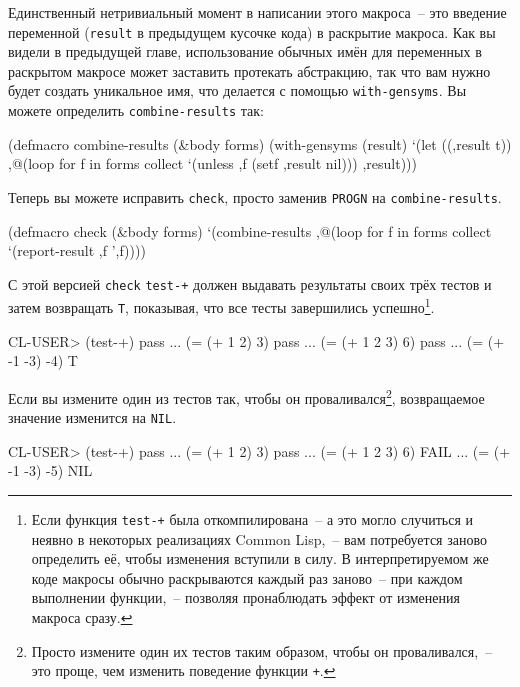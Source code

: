 Единственный нетривиальный момент в написании этого макроса~-- это введение переменной
(\lstinline{result} в предыдущем кусочке кода) в раскрытие макроса. Как вы видели в предыдущей
главе, использование обычных имён для переменных в раскрытом макросе может заставить
протекать абстракцию, так что вам нужно будет создать уникальное имя, что делается с
помощью \lstinline{with-gensyms}. Вы можете определить \lstinline{combine-results} так:

\begin{myverb}
(defmacro combine-results (&body forms)
  (with-gensyms (result)
    `(let ((,result t))
      ,@(loop for f in forms collect `(unless ,f (setf ,result nil)))
      ,result)))
\end{myverb}

Теперь вы можете исправить \lstinline{check}, просто заменив \lstinline{PROGN} на
\lstinline{combine-results}.

\begin{myverb}
(defmacro check (&body forms)
  `(combine-results
    ,@(loop for f in forms collect `(report-result ,f ',f))))
\end{myverb}

С этой версией \lstinline{check} \lstinline{test-+} должен выдавать результаты своих трёх тестов и
затем возвращать \lstinline{T}, показывая, что все тесты завершились успешно\footnote{Если
  функция \lstinline{test-+} была откомпилирована~-- а это могло случиться и неявно в
  некоторых реализациях Common Lisp,~-- вам потребуется заново определить её, чтобы
  изменения вступили в силу. В интерпретируемом же коде макросы обычно раскрываются каждый
  раз заново~-- при каждом выполнении функции,~-- позволяя пронаблюдать эффект от
  изменения макроса сразу.}.

\begin{myverb}
CL-USER> (test-+)
pass ... (= (+ 1 2) 3)
pass ... (= (+ 1 2 3) 6)
pass ... (= (+ -1 -3) -4)
T
\end{myverb}

Если вы измените один из тестов так, чтобы он проваливался\footnote{Просто измените один
  их тестов таким образом, чтобы он проваливался,~-- это проще, чем изменить поведение
  функции \lstinline{+}.}, возвращаемое значение изменится на \lstinline{NIL}.

\begin{myverb}
CL-USER> (test-+)
pass ... (= (+ 1 2) 3)
pass ... (= (+ 1 2 3) 6)
FAIL ... (= (+ -1 -3) -5)
NIL
\end{myverb}

